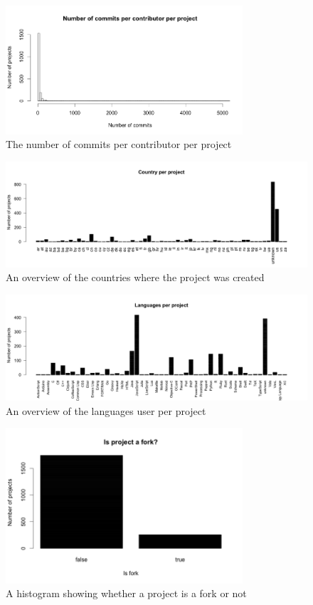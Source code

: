 	    \begin{figure}
	        \includegraphics[width=250pt]{figures/nr-commits-per-contributor}
	        \caption{The number of commits per contributor per project}
	        \label{fig:nr-commit-contributor-plot}
	    \end{figure}

	    \begin{figure}
	        \includegraphics[width=500pt]{figures/country-per-project}
	        \caption{An overview of the countries where the project was created}
	        \label{fig:country-plot}
	    \end{figure}

	    \begin{figure}
	        \includegraphics[width=500pt]{figures/languages-per-project}
	        \caption{An overview of the languages user per project}
	        \label{fig:language-frequency-plot}
	    \end{figure}

	    \begin{figure}
	        \includegraphics[width=250pt]{figures/isfork-per-project}
	        \caption{A histogram showing whether a project is a fork or not}
	        \label{fig:is-fork-plot}
	    \end{figure}

